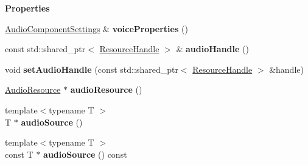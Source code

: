 \begin{Indent}\textbf{ Properties}\par
\begin{DoxyCompactItemize}
\item 
\mbox{\label{classrev_1_1_audio_source_component_a309966a28b29c0f03bfdbedb60e3f096}} 
\mbox{\hyperlink{structrev_1_1_audio_component_settings}{Audio\+Component\+Settings}} \& {\bfseries voice\+Properties} ()
\item 
\mbox{\label{classrev_1_1_audio_source_component_a48be27a78c95480aa9eee87c8a7e823d}} 
const std\+::shared\+\_\+ptr$<$ \mbox{\hyperlink{classrev_1_1_resource_handle}{Resource\+Handle}} $>$ \& {\bfseries audio\+Handle} ()
\item 
\mbox{\label{classrev_1_1_audio_source_component_a95e9ed32ca18362d56471a644468ca83}} 
void {\bfseries set\+Audio\+Handle} (const std\+::shared\+\_\+ptr$<$ \mbox{\hyperlink{classrev_1_1_resource_handle}{Resource\+Handle}} $>$ \&handle)
\item 
\mbox{\label{classrev_1_1_audio_source_component_a4fbcb479ada28051fa94a4789231a42d}} 
\mbox{\hyperlink{classrev_1_1_audio_resource}{Audio\+Resource}} $\ast$ {\bfseries audio\+Resource} ()
\item 
\mbox{\label{classrev_1_1_audio_source_component_a4204135c4d3f0bbf5841de2fdf8bcfb9}} 
{\footnotesize template$<$typename T $>$ }\\T $\ast$ {\bfseries audio\+Source} ()
\item 
\mbox{\label{classrev_1_1_audio_source_component_a602f0060c13584f7d37398796ceec08a}} 
{\footnotesize template$<$typename T $>$ }\\const T $\ast$ {\bfseries audio\+Source} () const
\end{DoxyCompactItemize}
\end{Indent}
